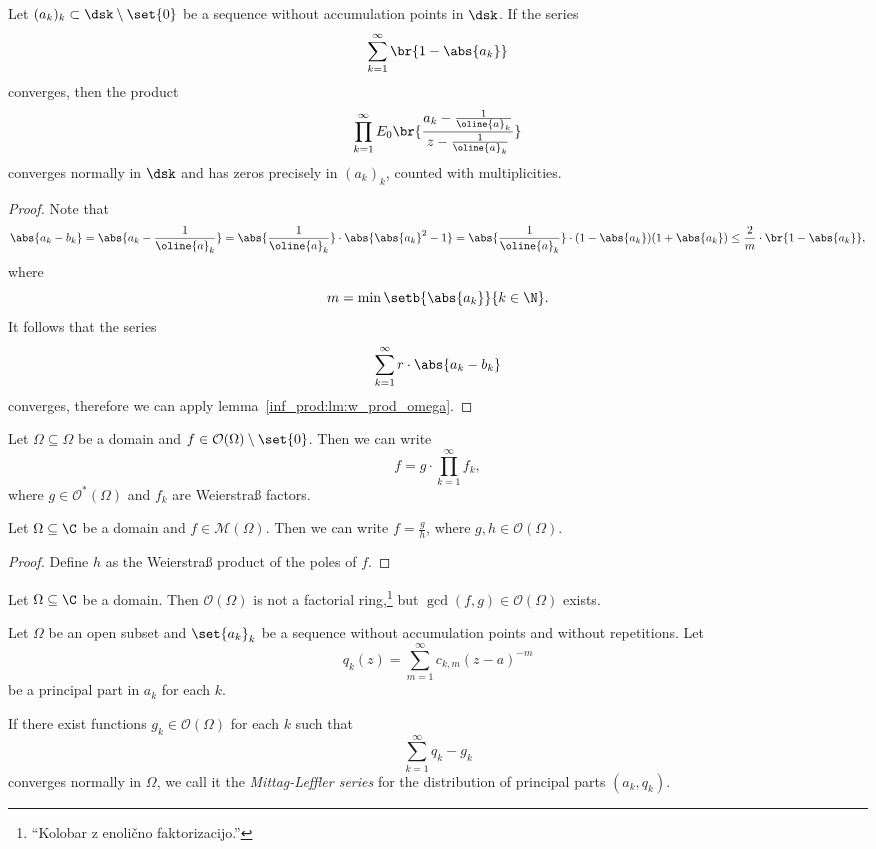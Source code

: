 \begin{posledica}
Let $(a_k)_k \subset \dsk \setminus \set{0}$ be a sequence without
accumulation points in $\dsk$. If the series
\[
\sum_{k=1}^\infty \br{1 - \abs{a_k}}
\]
converges, then the product
\[
\prod_{k=1}^\infty
E_0 \br{\frac{a_k - \frac{1}{\oline{a}_k}}
{z - \frac{1}{\oline{a}_k}}}
\]
converges normally in $\dsk$ and has zeros precisely in $(a_k)_k$,
counted with multiplicities.
\end{posledica}

\begin{proof}
Note that
\[
\abs{a_k - b_k} =
\abs{a_k - \frac{1}{\oline{a}_k}} =
\abs{\frac{1}{\oline{a}_k}} \cdot \abs{\abs{a_k}^2 - 1} =
\abs{\frac{1}{\oline{a}_k}} \cdot
(1 - \abs{a_k}) (1 + \abs{a_k}) \leq
\frac{2}{m} \cdot \br{1 - \abs{a_k}},
\]
where
\[
m = \min \setb{\abs{a_k}}{k \in \N}.
\]
It follows that the series
\[
\sum_{k=1}^\infty r \cdot \abs{a_k - b_k}
\]
converges, therefore we can apply
lemma~\ref{inf_prod:lm:w_prod_omega}.
\end{proof}

\begin{izrek}
Let $\Omega \subseteq \Omega$ be a domain and
$f \in \mathcal{O}(\Omega) \setminus \set{0}$. Then we can write
\[
f = g \cdot \prod_{k=1}^\infty f_k,
\]
where $g \in \mathcal{O}^*(\Omega)$ and $f_k$ are Weierstraß
factors.
\end{izrek}

\obvs

\begin{izrek}
Let $\Omega \subseteq \C$ be a domain and
$f \in \mathcal{M}(\Omega)$. Then we can write $f = \frac{g}{h}$,
where $g, h \in \mathcal{O}(\Omega)$.
\end{izrek}

\begin{proof}
Define $h$ as the Weierstraß product of the poles of $f$.
\end{proof}

\begin{opomba}
Let $\Omega \subseteq \C$ be a domain. Then $\mathcal{O}(\Omega)$
is not a factorial ring,\footnote{``Kolobar z enolično
faktorizacijo.''} but $\gcd(f, g) \in \mathcal{O}(\Omega)$ exists.
\end{opomba}


\begin{definicija}
Let $\Omega$ be an open subset and $\set{a_k}_k$ be a sequence
without accumulation points and without repetitions. Let
\[
q_k(z) = \sum_{m=1}^\infty c_{k, m} (z - a)^{-m}
\]
be a principal part in $a_k$ for each $k$.

If there exist functions $g_k \in \mathcal{O}(\Omega)$ for each $k$
such that
\[
\sum_{k=1}^\infty q_k - g_k
\]
converges normally in $\Omega$, we call it the
\emph{Mittag-Leffler series} for the
distribution of principal parts $(a_k, q_k)$.
\end{definicija}

